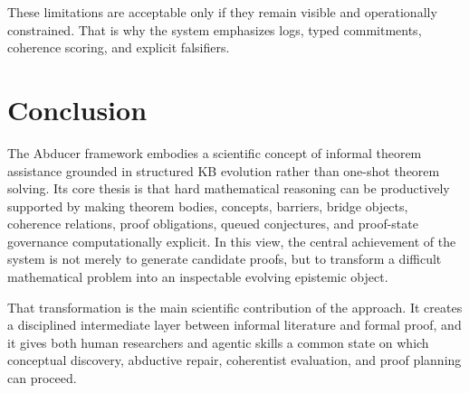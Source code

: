 \documentclass[11pt]{article}
\begin{document}
These limitations are acceptable only if they remain visible and operationally constrained. That is why the system emphasizes logs, typed commitments, coherence scoring, and explicit falsifiers.

\section{Conclusion}

The Abducer framework embodies a scientific concept of informal theorem assistance grounded in structured KB evolution rather than one-shot theorem solving. Its core thesis is that hard mathematical reasoning can be productively supported by making theorem bodies, concepts, barriers, bridge objects, coherence relations, proof obligations, queued conjectures, and proof-state governance computationally explicit. In this view, the central achievement of the system is not merely to generate candidate proofs, but to transform a difficult mathematical problem into an inspectable evolving epistemic object.

That transformation is the main scientific contribution of the approach. It creates a disciplined intermediate layer between informal literature and formal proof, and it gives both human researchers and agentic skills a common state on which conceptual discovery, abductive repair, coherentist evaluation, and proof planning can proceed.
\end{document}
